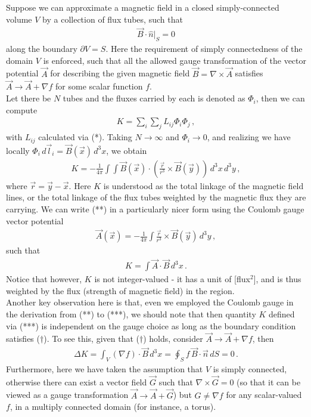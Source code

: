 \documentclass[11pt, onesided]{book}
\theoremstyle{break}
\theoremstyle{break}
\newcommand{\pd}{\partial}
\begin{document}
Suppose we can approximate a magnetic field in a closed simply-connected volume $V$ by a collection of flux tubes, such that 
\begin{align*}
\vec{B}\cdot \hat{n}|_S = 0 \tag{$\dagger$}
\end{align*}
along the boundary $\pd V = S$. Here the requirement of simply connectedness of the domain $V$ is enforced, such that all the allowed gauge transformation of the vector potential $\vec{A}$ for describing the given magnetic field $\vec{B} = \nabla \times \vec{A}$ satisfies $\vec{A} \to \vec{A} + \nabla f$ for some scalar function $f$.\\

Let there be $N$ tubes and the fluxes carried by each is denoted as $\Phi_i$, then we can compute
\begin{align*}
K = \sum_i \sum_j L_{ij} \Phi_i \Phi_j\,,
\end{align*}
with $L_{ij}$ calculated via (*). Taking $N \to \infty$ and $\Phi_i \to 0$, and realizing we have locally $\Phi_i \, d\vec{l}_i = \vec{B}(\vec{x})\, d^3x$, we obtain 
\begin{align*}
K = -\frac{1}{4\pi}\int \int \vec{B}(\vec{x}) \cdot \left( \frac{\vec{r}}{r^3} \times \vec{B}(\vec{y})\right) \, d^3x \, d^3y\,,\tag{**}
\end{align*}
where $\vec{r} = \vec{y} - \vec{x}$. Here $K$ is understood as the total linkage of the magnetic field lines, or the total linkage of the flux tubes weighted by the magnetic flux they are carrying. We can write (**) in a particularly nicer form using the Coulomb gauge vector potential 
\begin{align*}
\vec{A}(\vec{x}) = -\frac{1}{4\pi}\int \frac{\vec{r}}{r^3} \times \vec{B}(\vec{y}) \, d^3y\,,
\end{align*}
such that 
\begin{align*}
K = \int \vec{A}\cdot \vec{B}\, d^3x\,. \tag{***}
\end{align*}
Notice that however, $K$ is not integer-valued - it has a unit of [flux$^2$], and is thus weighted by the flux (strength of magnetic field) in the region.\\

Another key observation here is that, even we employed the Coulomb gauge in the derivation from (**) to (***), we should note that then quantity $K$ defined via (***) is independent on the gauge choice as long as the boundary condition satisfies ($\dagger$).  To see this, given that ($\dagger$) holds, consider $\vec{A} \to \vec{A} + \nabla f$, then
\begin{align*}
\Delta K = \int_V(\nabla f) \cdot \vec{B} \, d^3x = \oint_{S} f\,\vec{B}\cdot \vec{n} \, dS = 0\,.
\end{align*}
Furthermore, here we have taken the assumption that $V$ is simply connected, otherwise there can exist a vector field $\vec{G}$ such that $\nabla \times \vec{G} = 0$ (so that it can be viewed as a gauge transformation $\vec{A} \to \vec{A} + \vec{G}$) but $G \neq \nabla f$ for any scalar-valued $f$, in a multiply connected domain (for instance, a torus). \\
\end{document}
